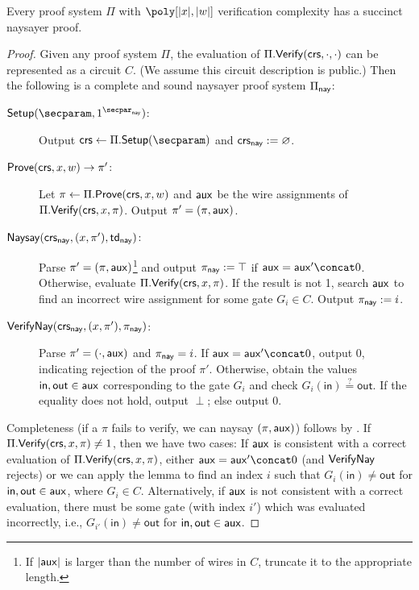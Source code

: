 \begin{theorem}\label{thm:naysayer}
    Every proof system $\Pi$ with $\poly[\sizeof{x}, \sizeof{\witness}]$ verification complexity has a succinct naysayer proof.
\end{theorem}
\begin{proof}
Given any proof system $\Pi$, the evaluation of $\Pi.\mathsf{Verify}(\mathsf{crs},\cdot,\cdot)$ can be represented as a circuit $C$. (We assume this circuit description is public.) 
Then the following is a complete and sound naysayer proof system $\Pi_{\mathsf{nay}}$:

\begin{description}
    \item[$\Setup(\secparam, \naysecparam)$:] Output $\crs \gets \Pi.\Setup(\secparam)$ and $\mathsf{crs}_{\mathsf{nay}} := \varnothing$.
    \item[$\mathsf{Prove}(\mathsf{crs}, x, w) \to \pi'$:] Let $\pi \gets \Pi.\mathsf{Prove}(\mathsf{crs}, x, w)$ and $\mathsf{aux}$ be the wire assignments of $\Pi.\mathsf{Verify}(\mathsf{crs}, x, \pi)$. Output $\pi' = (\pi, \mathsf{aux})$.
    \item[$\mathsf{Naysay}(\mathsf{crs}_{\mathsf{nay}}, (x, \pi'), \mathsf{td}_{\mathsf{nay}})$:] Parse $\pi' = (\pi, \mathsf{aux})$\footnote{If $\lvert \mathsf{aux} \rvert$ is larger than the number of wires in $C$, truncate it to the appropriate length.} and output $\pi_{\mathsf{nay}} := \top$ if $\aux = \aux' \concat 0$. Otherwise, evaluate $\Pi.\mathsf{Verify}(\mathsf{crs}, x, \pi)$. If the result is not 1, search $\mathsf{aux}$ to find an incorrect wire assignment for some gate $G_i \in C$. %
    Output $\pi_{\mathsf{nay}} := i$.
    \item[${\mathsf{Verify}}\mathsf{Nay}(\mathsf{crs}_{\mathsf{nay}}, (x, \pi'), \pi_{\mathsf{nay}})$:] Parse $\pi' = (\cdot, \mathsf{aux})$ and $\pi_{\mathsf{nay}} = i$. If $\aux = \aux' \concat 0$, output 0, indicating rejection of the proof $\pi'$. Otherwise, obtain the values $\mathsf{in},\mathsf{out} \in \mathsf{aux}$ corresponding to the gate $G_i$ %
    and check $G_i(\mathsf{in}) \stackrel{?}{=} \mathsf{out}$. If the equality does not hold, output $\perp$; else output 0.
\end{description}

Completeness (if a $\pi$ fails to verify, we can naysay $(\pi, \mathsf{aux})$) follows by . If $\Pi.\mathsf{Verify}(\mathsf{crs},x,\pi) \neq 1$, then we have two cases: If $\mathsf{aux}$ is consistent with a correct evaluation of $\Pi.\mathsf{Verify}(\mathsf{crs}, x, \pi)$, either $\aux = \aux' \concat 0$ (and ${\mathsf{Verify}}\mathsf{Nay}$ rejects) or we can apply the lemma to find an index $i$ such that $G_i(\mathsf{in}) \neq \mathsf{out}$ for $\mathsf{in}, \mathsf{out} \in \mathsf{aux}$, where $G_i \in C$. Alternatively, if $\mathsf{aux}$ is not consistent with a correct evaluation, there must be some gate (with index $i'$) which was evaluated incorrectly, i.e., $G_{i'}(\mathsf{in}) \neq \mathsf{out}$ for $\mathsf{in}, \mathsf{out} \in \mathsf{aux}$.


\end{proof}
